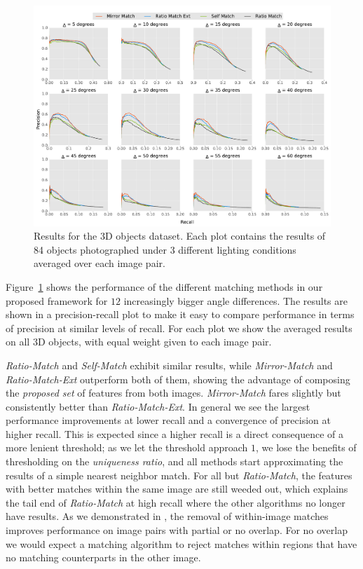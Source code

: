 \documentclass[review]{elsarticle}
\begin{document}
\begin{figure}[t]
	\centering
    \includegraphics[width=\columnwidth]{images/results_all_objects}
    \caption{Results for the 3D objects dataset. Each plot 
    contains the results of 84 objects photographed under 3 
different lighting conditions averaged over each image pair.}
    \label{fig:all_objects}
\end{figure}

Figure~\ref{fig:all_objects} shows the performance of the different matching methods in our proposed framework for $12$ increasingly bigger angle differences. The results are shown in a precision-recall plot to make it easy to compare performance in terms of precision at similar levels of recall.  For each plot we show the averaged results on all 3D objects, with equal weight given to each image pair.

\emph{Ratio-Match} and \emph{Self-Match} exhibit similar results, while \emph{Mirror-Match} and \emph{Ratio-Match-Ext} outperform both of them, showing the advantage of composing the \emph{proposed set} of features from both images. \emph{Mirror-Match} fares slightly but consistently better than \emph{Ratio-Match-Ext}. In general we see the largest performance improvements at lower recall and a  convergence of precision at higher recall. This is expected since a higher recall is a direct consequence of a more lenient threshold; as we let the threshold approach $1$, we lose the benefits of thresholding on the \emph{uniqueness ratio}, and all methods start approximating the results of a simple nearest neighbor match. For all but \emph{Ratio-Match}, the features with better matches within the same image are still weeded out, which explains the tail end of \emph{Ratio-Match} at high recall where the other algorithms no longer have results. As we demonstrated in \cite{arnfred2013mirror}, the removal of within-image matches improves performance on image pairs with partial or no overlap. For no overlap we would expect a matching algorithm to reject matches within regions that have no matching counterparts in the other image.
\end{document}
